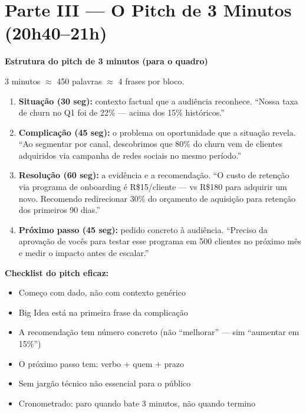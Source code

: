 \section{Parte III — O Pitch de 3 Minutos (20h40–21h)}

\begin{BoardBox}
\textbf{Estrutura do pitch de 3 minutos (para o quadro)}

3 minutos $\approx$ 450 palavras $\approx$ 4 frases por bloco.

\begin{enumerate}
  \item \textbf{Situação (30 seg):} contexto factual que a audiência reconhece.
  ``Nossa taxa de churn no Q1 foi de 22\% — acima dos 15\% históricos.''
  \item \textbf{Complicação (45 seg):} o problema ou oportunidade que a situação revela.
  ``Ao segmentar por canal, descobrimos que 80\% do churn vem de clientes
  adquiridos via campanha de redes sociais no mesmo período.''
  \item \textbf{Resolução (60 seg):} a evidência e a recomendação.
  ``O custo de retenção via programa de onboarding é R\$15/cliente — vs
  R\$180 para adquirir um novo. Recomendo redirecionar 30\% do orçamento
  de aquisição para retenção dos primeiros 90 dias.''
  \item \textbf{Próximo passo (45 seg):} pedido concreto à audiência.
  ``Preciso da aprovação de vocês para testar esse programa em 500 clientes
  no próximo mês e medir o impacto antes de escalar.''
\end{enumerate}
\end{BoardBox}

\begin{SolvedBox}
\textbf{Checklist do pitch eficaz:}
\begin{itemize}
  \item[$\square$] Começo com dado, não com contexto genérico
  \item[$\square$] Big Idea está na primeira frase da complicação
  \item[$\square$] A recomendação tem número concreto (não ``melhorar'' — sim ``aumentar em 15\%'')
  \item[$\square$] O próximo passo tem: verbo + quem + prazo
  \item[$\square$] Sem jargão técnico não essencial para o público
  \item[$\square$] Cronometrado: paro quando bate 3 minutos, não quando termino
\end{itemize}
\end{SolvedBox}


